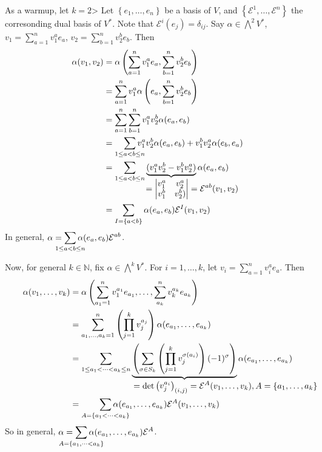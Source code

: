 \documentclass[10pt,letterpaper]{article}
\newcommand{\n}{\hfill\break}
\newcommand{\set}[1]{\left\{#1\right\}}
\newcommand{\naturals}{\mathbb{N}}
\newcommand{\N}{\naturals}
\newcommand{\paren}[1]{\left(#1\right)}
\begin{document}
\newpage
\par\noindent
As a warmup, let $k=2$> Let $\set{e_{1},\ldots,e_{n}}$ be a basis of $V$, and $\set{\mathcal{E}^{1},\ldots,\mathcal{E}^{n}}$ the corresonding dual basis of $V^{*}$. Note that $\mathcal{E}^{i}(e_{j})=\delta_{ij}$.\n
Say $\alpha\in\bigwedge^{2}V^{*}$, $v_{1}=\sum_{a=1}^{n}v_{1}^{a}e_{a}$, $v_{2}=\sum_{b=1}^{n}v_{2}^{b}e_{b}$. Then
\begin{align*}
	\alpha(v_{1},v_{2}) & =\alpha\paren{\sum_{a=1}^{n}v_{1}^{a}e_{a},\sum_{b=1}^{n}v_{2}^{b}e_{b}}\\
	& =\sum_{a=1}^{n}v_{1}^{a}\alpha\paren{e_{a},\sum_{b=1}^{n}v_{2}^{b}e_{b}}\\
	& =\sum_{a=1}^{n}\sum_{b=1}^{n}v_{1}^{a}v_{2}^{b}\alpha(e_{a},e_{b})\\
	& =\smashoperator[r]{\sum_{1\le{}a<b\le{}n}}v_{1}^{a}v_{2}^{b}\alpha(e_{a},e_{b})+v_{1}^{b}v_{2}^{a}\alpha(e_{b},e_{a})\\
	& =\sum_{1\le{}a<b\le{}n}\underbrace{(v_{1}^{a}v_{2}^{b}-v_{1}^{b}v_{2}^{a})}_{\displaystyle\hspace{-6em}\mathrlap{=\left|\begin{matrix}
			v_{1}^{a} & v_{2}^{a}\\ v_{1}^{b} & v_{2}^{b})
		\end{matrix}\right|=\mathcal{E}^{ab}(v_{1},v_{2})}}\alpha(e_{a},e_{b})\\
	& =\sum_{I=\set{a<b}}\alpha(e_{a},e_{b})\mathcal{E}^{I}(v_{1},v_{2})
\end{align*}
In general, $\displaystyle\alpha=\smashoperator{\sum_{1\le{}a<b\le{}n}}\alpha(e_{a},e_{b})\mathcal{E}^{ab}$.\n

\par\noindent
Now, for general $k\in\N$, fix $\alpha\in\bigwedge^{k}V^{*}$. For $i=1,\ldots,k$, let $v_{i}=\sum_{a=1}^{n}v_{i}^{a}e_{a}$. Then
\begin{align*}
	\alpha(v_{1},\ldots,v_{k}) & =\alpha\paren{\sum_{a_{1}=1}^{n}v_{1}^{a_{1}}e_{a_{1}},\ldots,\sum_{a_{k}}^{n}v_{k}^{a_{k}}e_{a_{k}}}\\
	& =\sum_{a_{1},\ldots,a_{k}=1}^{n}\paren{\prod_{j=1}^{k}v_{j}^{a_{j}}}\alpha(e_{a_{1}},\ldots,e_{a_{k}})\\
	& =\sum_{1\le{}a_{1}<\cdots<a_{k}\le{}n}\underbrace{\paren{\sum_{\sigma\in{}S_{k}}\paren{\prod_{j=1}^{k}v_{j}^{\sigma(a_{i})}}(-1)^{\sigma}}}_{\displaystyle\hspace{-12em}\mathrlap{=\det\begin{pmatrix}v_{j}^{a_{i}}\end{pmatrix}_{(i,j)}=\mathcal{E}^{A}(v_{1},\ldots,v_{k}),A=\set{a_{1},\ldots,a_{k}}}}\alpha(e_{a_{1}},\ldots,e_{a_{k}})\\
	& =\smashoperator[r]{\sum_{A=\set{a_{1}<\cdots<a_{k}}}}\alpha(e_{a_{1}},\ldots,e_{a_{k}})\mathcal{E}^{A}(v_{1},\ldots,v_{k})
\end{align*}
So in general, $\displaystyle\alpha=\smashoperator{\sum_{A=\set{a_{1},\cdots<a_{k}}}}\alpha(e_{a_{1}},\ldots,e_{a_{k}})\mathcal{E}^{A}$.\n
\end{document}
